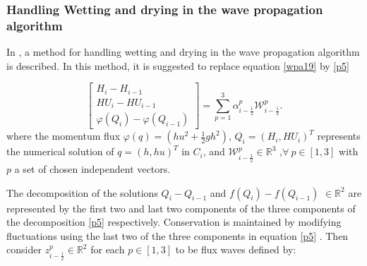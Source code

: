 \documentclass[10pt,a4paper]{article}
\newcommand{\donna}[1]{{\color{red}{#1}}}
\begin{document}
	\subsubsection{Handling Wetting and drying in the wave propagation algorithm}
	
	
	In  \citet{ge:2008,ge:2011}, a method for handling wetting and drying in the wave propagation algorithm is described.  In this method, it is suggested to replace  equation	\eqref{wpa19} by  \eqref{p5}
	
	
	\begin{equation}
		\begin{bmatrix} 
			H_{i} - H_{i-1}\\ 	HU_{i} - HU_{i-1} \\  \varphi(Q_{i}) - \varphi(Q_{i-1}) 
		\end{bmatrix} = \sum_{p=1}^{3} \alpha_{i-\frac{1}{2}}^{p} \mathcal{W}_{i-\frac{1}{2}}^{p}.
		\label{p5}
	\end{equation}
	where the momentum flux $\varphi(q) = (hu^{2} + \frac{1}{2} gh^{2})$, $Q_{i} = (H_{i},HU_{i})^{T}$ represents the numerical solution of $q = (h,hu)^{T}$ in $C_{i}$, and $\mathcal{W}_{i-\frac{1}{2}}^{p} \in \mathbb{R}^{3}$ ,$\forall ~ p \in [1,3] $ with $p$ a set of chosen independent vectors. 
	
	The decomposition of the solutions $Q_{i} - Q_{i-1} $  and  $f(Q_{i}) - f(Q_{i-1})$ $ \in  \mathbb{R}^{2}$ are represented by the first two and last two components of the three components of the decomposition \eqref{p5} respectively.  Conservation is maintained by modifying fluctuations using the last two of the three components  in equation \eqref{p5} . Then  consider $z_{i-\frac{1}{2}}^{p} \in \mathbb{R}^{2}$ for each $p \in [1,3]$ to be flux waves defined by:
	
	
\end{document}

